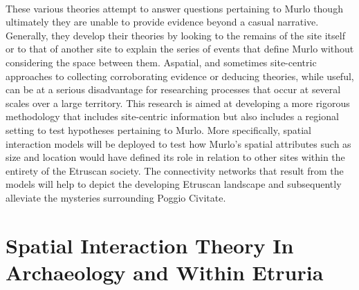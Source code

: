\documentclass[12pt,a4paper]{thesis}
\begin{document}
\paragraph{}	
These various theories attempt to answer questions pertaining to Murlo though ultimately they are unable to provide evidence beyond a casual narrative.  Generally, they develop their theories by looking to the remains of the site itself or to that of another site to explain the series of events that define Murlo without considering the space between them. Aspatial, and sometimes site-centric approaches to collecting corroborating evidence or deducing theories, while useful, can be at a serious disadvantage for researching processes that occur at several scales over a large territory. This research is aimed at developing a more rigorous methodology that includes site-centric information but also includes a regional setting to test hypotheses pertaining to Murlo. More specifically, spatial interaction models will be deployed to test how Murlo's spatial attributes such as size and location would have defined its role in relation to other sites within the entirety of the Etruscan society.  The connectivity networks that result from the models will help to depict the developing Etruscan landscape and subsequently alleviate the mysteries surrounding Poggio Civitate.


\section{Spatial Interaction Theory In Archaeology and Within Etruria}
\end{document}
